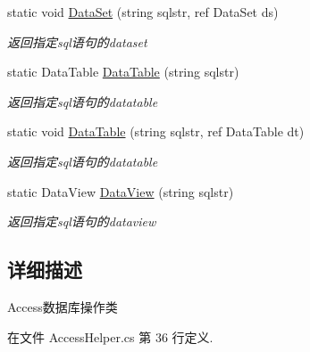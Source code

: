 \begin{DoxyCompactItemize}
static void \hyperlink{class_x_c_l_net_tools_1_1_data_base_1_1_access_1_1_access_helper_aa66ad22b5bfc24c630e34a62a085995f}{Data\-Set} (string sqlstr, ref Data\-Set ds)
\begin{DoxyCompactList}\small\item\em 返回指定sql语句的dataset \end{DoxyCompactList}\item 
static Data\-Table \hyperlink{class_x_c_l_net_tools_1_1_data_base_1_1_access_1_1_access_helper_aec0d16c3a29668e1298500b0f87d0f6e}{Data\-Table} (string sqlstr)
\begin{DoxyCompactList}\small\item\em 返回指定sql语句的datatable \end{DoxyCompactList}\item 
static void \hyperlink{class_x_c_l_net_tools_1_1_data_base_1_1_access_1_1_access_helper_a4ee3cbd4a9212d6df954c2228c2ff2f4}{Data\-Table} (string sqlstr, ref Data\-Table dt)
\begin{DoxyCompactList}\small\item\em 返回指定sql语句的datatable \end{DoxyCompactList}\item 
static Data\-View \hyperlink{class_x_c_l_net_tools_1_1_data_base_1_1_access_1_1_access_helper_a3979a6d17790d9ecc1cc9c4bcf56de84}{Data\-View} (string sqlstr)
\begin{DoxyCompactList}\small\item\em 返回指定sql语句的dataview \end{DoxyCompactList}\end{DoxyCompactItemize}


\subsection{详细描述}
Access数据库操作类 



在文件 Access\-Helper.\-cs 第 36 行定义.



